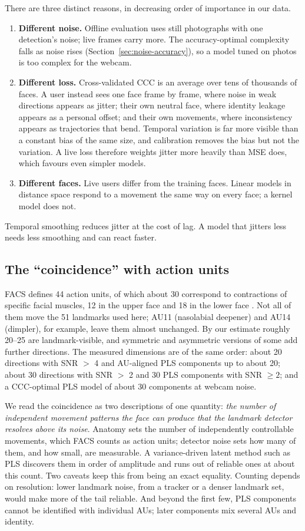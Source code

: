 \documentclass[11pt,a4paper]{article}
\begin{document}
There are three distinct reasons, in decreasing order of importance in our data.
\begin{enumerate}
  \item \textbf{Different noise.} Offline evaluation uses still photographs with one detection's
  noise; live frames carry more. The accuracy-optimal complexity falls as noise rises
  (Section~\ref{sec:noise-accuracy}), so a model tuned on photos is too complex for the webcam.
  \item \textbf{Different loss.} Cross-validated CCC is an average over tens of thousands of faces.
  A user instead sees one face frame by frame, where noise in weak directions appears as jitter;
  their own neutral face, where identity leakage appears as a personal offset; and their own
  movements, where inconsistency appears as trajectories that bend. Temporal variation is far more
  visible than a constant bias of the same size, and calibration removes the bias but not the
  variation. A live loss therefore weights jitter more heavily than MSE does, which favours even
  simpler models.
  \item \textbf{Different faces.} Live users differ from the training faces. Linear models in
  distance space respond to a movement the same way on every face; a kernel model does not.
\end{enumerate}
Temporal smoothing reduces jitter at the cost of lag. A model that jitters less needs less smoothing
and can react faster.

\subsection{The ``coincidence'' with action units}

FACS defines 44 action units, of which about 30 correspond to contractions of specific facial
muscles, 12 in the upper face and 18 in the lower face \citep{tian2001recognizing}. Not all of them
move the 51 landmarks used here; AU11 (nasolabial deepener) and AU14 (dimpler), for example, leave
them almost unchanged. By our estimate roughly 20--25 are landmark-visible, and symmetric and
asymmetric versions of some add further directions. The measured dimensions are of the same order:
about 20 directions with SNR $>$ 4 and AU-aligned PLS components up to about 20; about 30
directions with SNR $>$ 2 and 30 PLS components with SNR $\ge 2$; and a CCC-optimal PLS model of
about 30 components at webcam noise.

We read the coincidence as two descriptions of one quantity: \emph{the number of independent
movement patterns the face can produce that the landmark detector resolves above its noise}.
Anatomy sets the number of independently controllable movements, which FACS counts as action
units; detector noise sets how many of them, and how small, are measurable. A variance-driven latent
method such as PLS discovers them in order of amplitude and runs out of reliable ones at about this
count. Two caveats keep this from being an exact equality. Counting depends on resolution: lower
landmark noise, from a tracker or a denser landmark set, would make more of the tail reliable.
And beyond the first few, PLS components cannot be identified with individual AUs; later components
mix several AUs and identity.
\end{document}
